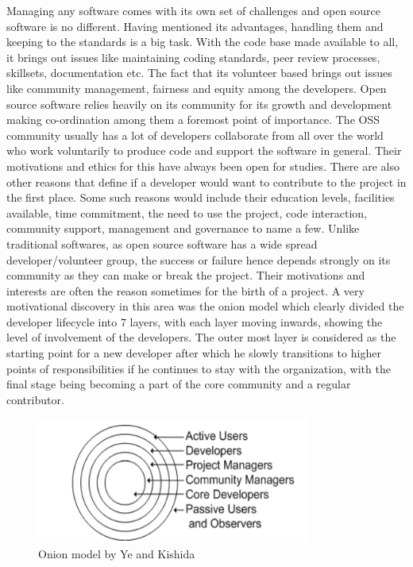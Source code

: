 \documentclass[seploa]{beavtex}
\begin{document}
Managing any software comes with its own set of challenges and open source software is no different. Having mentioned its advantages, handling them and keeping to the standards is a big task. With the code base made available to all, it brings out issues like maintaining coding standards, peer review processes, skillsets, documentation etc\cite{tum2005}. The fact that its volunteer based brings out issues like community management, fairness and equity among the developers. Open source software relies heavily on its community for its growth and development\cite{seth2010} making co-ordination among them a foremost point of importance. The OSS community usually has a lot of developers collaborate from all over the world who work voluntarily to produce code and support the software in general. Their motivations and ethics for this have always been open for studies\cite{greg2002}. There are also other reasons that define if a developer would want to contribute to the project in the first place. Some such reasons would include their education levels, facilities available, time commitment, the need to use the project, code interaction, community support, management and governance to name a few\cite{chawn2012}. Unlike traditional softwares, as open source software has a wide spread developer/volunteer group, the success or failure hence depends strongly on its community as they can make or break the project. Their motivations and interests are often the reason sometimes for the birth of a project. A very motivational discovery in this area was the onion model which clearly divided the developer lifecycle into 7 layers, with each layer moving inwards, showing the level of involvement of the developers. The outer most layer is considered as the starting point for a new developer after which he slowly transitions to higher points of responsibilities if he continues to stay with the organization, with the final stage being becoming a part of the core community and a regular contributor\cite{kishida2003}.

\begin{figure}[H]
\centering
\includegraphics[width=90mm]{onion.png}
\caption{Onion model by Ye and Kishida}
\end{figure}
\end{document}
